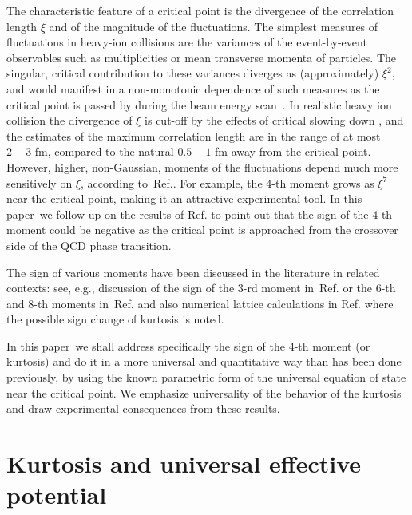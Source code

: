 \documentclass[prl,twocolumn,nofootinbib]{revtex4}
\newcommand\paper{paper}
\begin{document}
The characteristic feature of a critical point is the divergence of
the correlation length $\xi$ and of the magnitude of the fluctuations.
The simplest measures of fluctuations in heavy-ion collisions are the
variances of the event-by-event observables such as multiplicities or
mean transverse momenta of particles. The singular, critical
contribution to these variances diverges as (approximately) $\xi^2$,
and would manifest in a non-monotonic dependence
of such measures as the critical point is passed by during the beam
energy scan~\cite{Stephanov:1998dy,Stephanov:1999zu}. In realistic
heavy ion collision the divergence of $\xi$ is cut-off by the effects
of critical slowing down \cite{Stephanov:1999zu,Berdnikov:1999ph}, and
the estimates of the maximum correlation length are in the range of at
most $2-3$ fm, compared to the natural $0.5-1$ fm away from the
critical point.  However, higher, non-Gaussian, moments of the
fluctuations depend much more sensitively on $\xi$, according
to~Ref.\cite{Stephanov:2008qz}. For example, the 4-th moment grows as
$\xi^7$ near the critical point, making it an attractive experimental
tool.  In this \paper\ we follow up on the results of
Ref.\cite{Stephanov:2008qz} to point out that the sign of the 4-th
moment could be negative as the critical point is approached from the
crossover side of the QCD phase transition.

The sign of various moments have been discussed in the literature in
related contexts: see, e.g., discussion of the sign of
the 3-rd moment in~Ref.\cite{Asakawa:2009aj} or the 6-th and 8-th
moments in~Ref.\cite{Friman:2011pf} and also numerical lattice
calculations in Ref.\cite{Gavai:2010zn} where the possible sign change
of kurtosis is noted.  

In this \paper\ we shall address specifically the sign of the 4-th
moment (or kurtosis) and do it in a more universal and quantitative
way than has been done previously, by using the known parametric form
of the universal equation of state near the critical point. We
emphasize universality of the behavior of the kurtosis and draw
experimental consequences from these results.


\section{Kurtosis and universal effective potential}
\label{sec:kurt-univ-effect}
\end{document}
